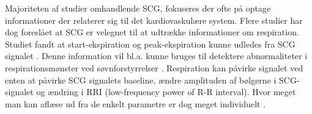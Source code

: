 Majoriteten af studier omhandlende SCG, fokuseres der ofte på optage informationer der relaterer sig til det kardiovaskulære system. Flere studier har dog foreslået at SCG er velegnet til at udtrække informationer om respiration. Studiet fandt at start-ekspiration og peak-ekspiration kunne udledes fra SCG signalet \cite{pandia} \cite{magic}. Denne information vil  bl.a. kunne bruges til detektere abnormaliteter i respirationsmønster ved søvnforstyrrelser \cite{tavaloka}.  Respiration kan påvirke signalet ved enten at påvirke SCG signalets baseline, ændre amplituden af bølgerne i SCG-signalet og ændring i RRI (low-frequency power of R-R interval). Hvor meget man kan aflæse ud fra de enkelt parametre er dog meget individuelt \cite{magic}.